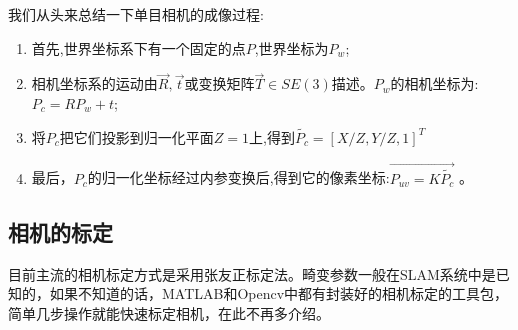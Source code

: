 我们从头来总结一下单目相机的成像过程:
\begin{enumerate}
\item 首先,世界坐标系下有一个固定的点$P$,世界坐标为$P_w$;
\item 相机坐标系的运动由$\vec{R},\vec{t}$或变换矩阵$\vec{T} \in SE(3)$描述。$P_w$的相机坐标为:$P_{c}=R P_{w}+t$;
\item 将$P_c$把它们投影到归一化平面$Z=1$上,得到$\tilde{P_c}=[X / Z, Y / Z, 1]^{T}$
\item 最后，$P_c$的归一化坐标经过内参变换后,得到它的像素坐标:$\vec{P_{uv}=K\tilde{P_c}}$ 。
\end{enumerate}\par
\subsection{相机的标定}
目前主流的相机标定方式是采用张友正标定法\cite{zhang1999flexible}。畸变参数一般在SLAM系统中是已知的，如果不知道的话，MATLAB和Opencv中都有封装好的相机标定的工具包，简单几步操作就能快速标定相机，在此不再多介绍。